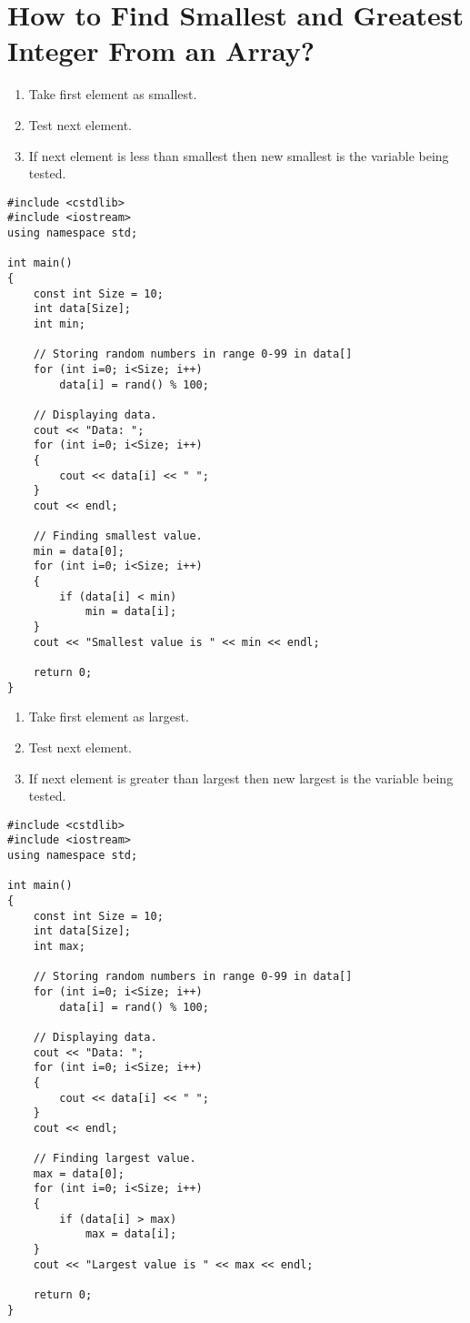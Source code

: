 \documentclass[12pt,a4paper]{article}
\begin{document}
\section{How to Find Smallest and Greatest Integer From an Array?}
\begin{enumerate}
\item Take first element as smallest.
\item Test next element.
\item If next element is less than smallest then new smallest is the variable being tested.
\end{enumerate}
\begin{lstlisting}[caption={Smallest Number in an Array}]
#include <cstdlib>
#include <iostream>
using namespace std;

int main()
{
	const int Size = 10;
	int data[Size];
	int min;
	
	// Storing random numbers in range 0-99 in data[]
	for (int i=0; i<Size; i++)
		data[i] = rand() % 100;
		
	// Displaying data.
	cout << "Data: ";
	for (int i=0; i<Size; i++)
	{
		cout << data[i] << " ";
	}
	cout << endl;

	// Finding smallest value.
	min = data[0];
	for (int i=0; i<Size; i++)
	{
		if (data[i] < min)
			min = data[i];
	}
	cout << "Smallest value is " << min << endl;

	return 0;
}
\end{lstlisting}
\begin{enumerate}
\item Take first element as largest.
\item Test next element.
\item If next element is greater than largest then new largest is the variable being tested.
\end{enumerate}
\begin{lstlisting}[caption={Largest Number in an Array}]
#include <cstdlib>
#include <iostream>
using namespace std;

int main()
{
	const int Size = 10;
	int data[Size];
	int max;
	
	// Storing random numbers in range 0-99 in data[]
	for (int i=0; i<Size; i++)
		data[i] = rand() % 100;
		
	// Displaying data.
	cout << "Data: ";
	for (int i=0; i<Size; i++)
	{
		cout << data[i] << " ";
	}
	cout << endl;

	// Finding largest value.
	max = data[0];
	for (int i=0; i<Size; i++)
	{
		if (data[i] > max)
			max = data[i];
	}
	cout << "Largest value is " << max << endl;

	return 0;
}
\end{lstlisting}
\end{document}
